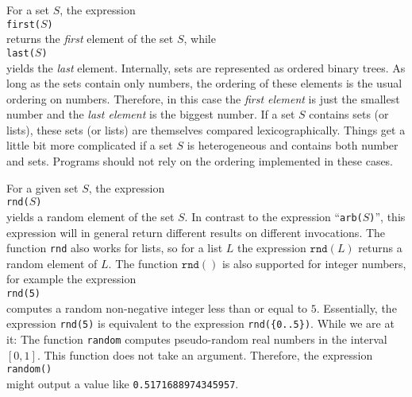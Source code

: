 For a set $S$,  the expression 
\\[0.2cm]
\hspace*{1.3cm}
\texttt{first($S$)}
\\[0.2cm]
returns the \emph{first} element of the set $S$, while
\\[0.2cm]
\hspace*{1.3cm}
\texttt{last($S$)} 
\\[0.2cm]
yields the \emph{last} element.  Internally, sets are represented as ordered binary trees.  As long
as the sets contain only numbers, the ordering of these elements is the usual ordering on
numbers. Therefore, in this case the \emph{first element} is just the smallest number and the 
\emph{last element} is the biggest number.  If a set $S$ contains sets (or lists), these sets (or
lists) are themselves compared lexicographically.  
Things get a little bit more complicated if a set $S$ is heterogeneous and contains both number and sets.
Programs should not rely on the ordering implemented in these cases.

For a given set $S$, the expression
\\[0.2cm]
\hspace*{1.3cm}
\texttt{rnd($S$)}
\\[0.2cm]
yields a random element of the set $S$.  
In contrast to the expression
``\texttt{arb($S$)}'',  this expression will in general return different results on
different invocations.  The function \texttt{rnd} also works for lists, so for a list $L$
the expression $\texttt{rnd}(L)$ returns a random element of $L$.
The function $\mathtt{rnd}()$ is also supported for integer numbers, for example the expression
\\[0.2cm]
\hspace*{1.3cm}
\texttt{rnd(5)}
\\[0.2cm]
computes a random non-negative integer less than or equal to $5$. Essentially, the expression
\texttt{rnd(5)} is equivalent to the expression
\texttt{rnd(\{0..5\})}.  While we are at it: The function \texttt{random} computes pseudo-random
real numbers in the interval $[0,1]$.  This function does not take an argument. Therefore, the expression
\\[0.2cm]
\hspace*{1.3cm}
\texttt{random()}
\\[0.2cm]
might output a value like \texttt{0.5171688974345957}. 


